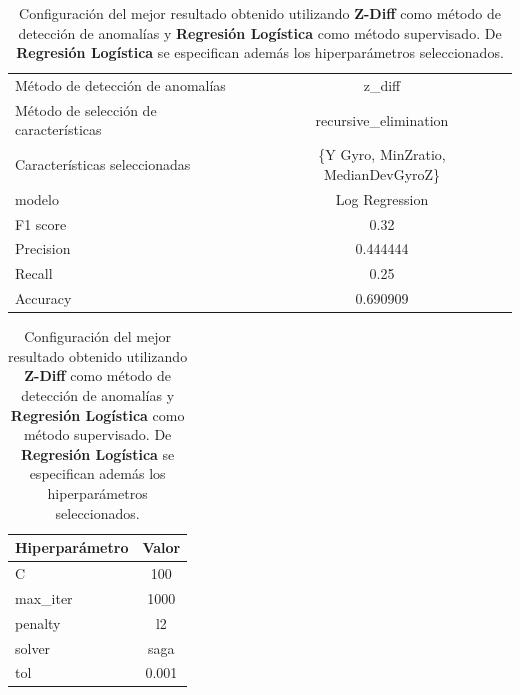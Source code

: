 \begin{appendices}
		\begin{table}[htb]
			\centering
			\caption{Configuración del mejor resultado obtenido utilizando \textbf{Z-Diff} como método de detección de anomalías y \textbf{Regresión Logística}
			como método supervisado. De \textbf{Regresión Logística} se especifican además los hiperparámetros seleccionados.}
			\label{table:30}
			\begin{tabular}{lc}
				\toprule
					  Método de detección de anomalías &                              z\_diff \\
				Método de selección de características &               recursive\_elimination \\
						 Características seleccionadas & \{Y Gyro, MinZratio, MedianDevGyroZ\} \\
												modelo &                      Log Regression \\
											  F1 score &                                0.32 \\
											 Precision &                            0.444444 \\
												Recall &                                0.25 \\
											  Accuracy &                            0.690909 \\
				\bottomrule
				\end{tabular}
			\newline
			\newline

			\begin{tabular}{lc}
				\toprule
				Hiperparámetro &  Valor \\
				\midrule
							 C &    100 \\
					  max\_iter &   1000 \\
					   penalty &     l2 \\
						solver &   saga \\
						   tol &  0.001 \\
				\bottomrule
			\end{tabular}
			
		\end{table}


\end{appendices}
